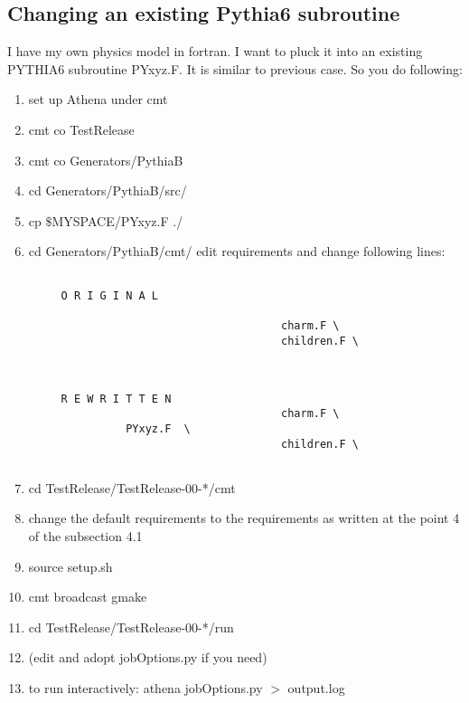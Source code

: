 \subsection{Changing an existing Pythia6 subroutine }
I have my own physics model in fortran.
I want to pluck it into an existing PYTHIA6 subroutine PYxyz.F.
It is similar to previous case. 
So you do following: \\



\begin{enumerate}
\vspace{-3mm}\item set up Athena under cmt
\vspace{-3mm}\item cmt co TestRelease
\vspace{-3mm}\item cmt co Generators/PythiaB
\vspace{-3mm}\item cd Generators/PythiaB/src/
\vspace{-3mm}\item cp ${\$}$MYSPACE/PYxyz.F ./
\vspace{-3mm}\item cd Generators/PythiaB/cmt/
edit requirements 
and change following lines:

\begin{verbatim}

     O R I G I N A L 
  
                                       charm.F \
                                       children.F \  
  
\end{verbatim}

\begin{verbatim}

     R E W R I T T E N 
                                       charm.F \
               PYxyz.F  \
                                       children.F \  


\end{verbatim}

\vspace{-3mm}\item cd TestRelease/TestRelease-00-*/cmt
\vspace{-3mm}\item change the default requirements to the
requirements as written at the point 4 of the  subsection 4.1
\vspace{-3mm}\item source setup.sh
\vspace{-3mm}\item cmt broadcast gmake
\vspace{-3mm}\item cd TestRelease/TestRelease-00-*/run
\vspace{-3mm}\item (edit and adopt jobOptions.py if you need)
\vspace{-3mm}\item to run interactively: athena jobOptions.py $>$ output.log




 \end{enumerate}

